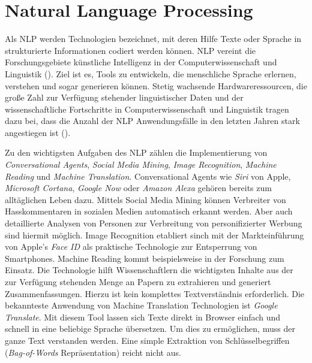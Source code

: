 \section{Natural Language Processing}

Als \ac{NLP} werden Technologien bezeichnet, mit deren Hilfe Texte oder Sprache in strukturierte Informationen codiert werden können. \ac{NLP} vereint die Forschungsgebiete künstliche Intelligenz in der Computerwissenschaft und Linguistik (\cite[vgl.][1]{ITWISSEN}). Ziel ist es, Tools zu entwickeln, die menschliche Sprache erlernen, verstehen und sogar generieren können. Stetig wachsende Hardwareressourcen, die große Zahl zur Verfügung stehender linguistischer Daten und der wissenschaftliche Fortschritte in Computerwissenschaft und Linguistik tragen dazu bei, dass die Anzahl der \ac{NLP} Anwendungsfälle in den letzten Jahren stark angestiegen ist (\cite[vgl.][1]{HIRSCHBERG}).\par

Zu den wichtigsten Aufgaben des \ac{NLP} zählen die Implementierung von \textit{Conversational Agents}, \textit{Social Media Mining}, \textit{Image Recognition}, \textit{Machine Reading} und \textit{Machine Translation}. Conversational Agents wie \textit{Siri} von Apple, \textit{Microsoft Cortana}, \textit{Google Now} oder \textit{Amazon Alexa} gehören bereits zum alltäglichen Leben dazu. Mittels Social Media Mining können Verbreiter von Hasskommentaren in sozialen Medien automatisch erkannt werden. Aber auch detaillierte Analysen von Personen zur Verbreitung von personifizierter Werbung sind hiermit möglich. Image Recognition etabliert sinch mit der Markteinführung von Apple's \textit{Face ID} als praktische Technologie zur Entsperrung von Smartphones. Machine Reading kommt beispielsweise in der Forschung zum Einsatz. Die Technologie hilft Wissenschaftlern die wichtigsten Inhalte aus der zur Verfügung stehenden Menge an Papern zu extrahieren und generiert Zusammenfassungen. Hierzu ist kein komplettes Textverständnis erforderlich. Die bekannteste Anwendung  von Machine Translation Technologien ist \textit{Google Translate}. Mit diesem Tool lassen sich Texte direkt in Browser einfach und schnell in eine beliebige Sprache übersetzen. Um dies zu ermöglichen, muss der ganze Text verstanden werden. Eine simple Extraktion von Schlüsselbegriffen (\textit{Bag-of-Words} Repräsentation) reicht nicht aus.

